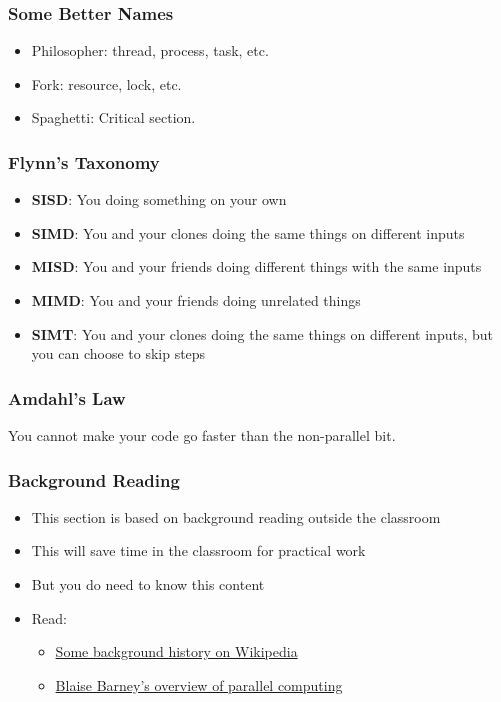 \subsubsection{Some Better Names}\label{some-better-names}

\begin{itemize}
\itemsep1pt\parskip0pt
\item
  Philosopher: thread, process, task, etc.
\item
  Fork: resource, lock, etc.
\item
  Spaghetti: Critical section.
\end{itemize}

\subsubsection{Flynn's Taxonomy}\label{flynns-taxonomy}

\begin{itemize}
\itemsep1pt\parskip0pt
\item
  \textbf{SISD}: You doing something on your own
\item
  \textbf{SIMD}: You and your clones doing the same things on different
  inputs
\item
  \textbf{MISD}: You and your friends doing different things with the
  same inputs
\item
  \textbf{MIMD}: You and your friends doing unrelated things
\item
  \textbf{SIMT}: You and your clones doing the same things on different
  inputs, but you can choose to skip steps
\end{itemize}

\subsubsection{Amdahl's Law}\label{amdahls-law}

You cannot make your code go faster than the non-parallel bit.

\subsubsection{Background Reading}\label{background-reading}

\begin{itemize}
\item
  This section is based on background reading outside the classroom
\item
  This will save time in the classroom for practical work
\item
  But you do need to know this content
\item
  Read:

  \begin{itemize}
  \itemsep1pt\parskip0pt
  \item
    \href{http://en.wikipedia.org/wiki/Supercomputer}{Some background
    history on Wikipedia}
  \item
    \href{https://computing.llnl.gov/tutorials/parallel_comp/}{Blaise
    Barney's overview of parallel computing}
  \end{itemize}
\end{itemize}

